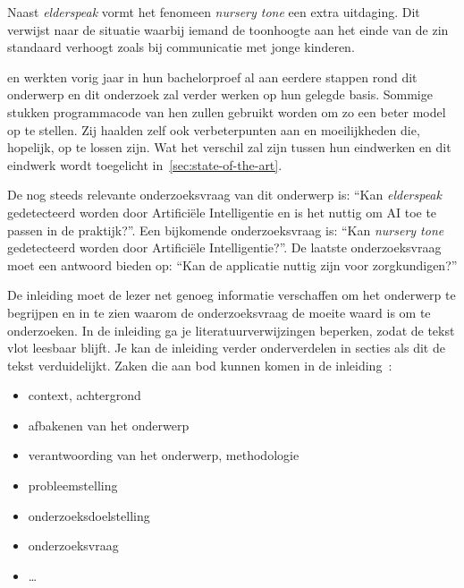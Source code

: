 Naast \textit{elderspeak} vormt het fenomeen \textit{nursery tone} een extra uitdaging. Dit verwijst naar de situatie waarbij iemand de toonhoogte aan het einde van de zin standaard verhoogt zoals bij communicatie met jonge kinderen.

\textcite{Beeckman2021} en \textcite{Standaert2021} werkten vorig jaar in hun bachelorproef al aan eerdere stappen rond dit onderwerp en dit onderzoek zal verder werken op hun gelegde basis.
Sommige stukken programmacode van hen zullen gebruikt worden om zo een beter model op te stellen.
Zij haalden zelf ook verbeterpunten aan en moeilijkheden die, hopelijk, op te lossen zijn. Wat het verschil zal zijn tussen hun eindwerken en dit eindwerk wordt toegelicht in~\ref{sec:state-of-the-art}.

De nog steeds relevante onderzoeksvraag van dit onderwerp is: ``Kan \textit{elderspeak} gedetecteerd worden door Artificiële Intelligentie en is het nuttig om AI toe te passen in de praktijk?''. Een bijkomende onderzoeksvraag is: ``Kan \textit{nursery tone} gedetecteerd worden door Artificiële Intelligentie?''. De laatste onderzoeksvraag moet een antwoord bieden op: ``Kan de applicatie nuttig zijn voor zorgkundigen?''

\color{blue}
De inleiding moet de lezer net genoeg informatie verschaffen om het onderwerp te begrijpen en in te zien waarom de onderzoeksvraag de moeite waard is om te onderzoeken. In de inleiding ga je literatuurverwijzingen beperken, zodat de tekst vlot leesbaar blijft. Je kan de inleiding verder onderverdelen in secties als dit de tekst verduidelijkt. Zaken die aan bod kunnen komen in de inleiding~\autocite{Pollefliet2011}:

\begin{itemize}
  \item context, achtergrond
  \item afbakenen van het onderwerp
  \item verantwoording van het onderwerp, methodologie
  \item probleemstelling
  \item onderzoeksdoelstelling
  \item onderzoeksvraag
  \item \ldots
\end{itemize}

\color{black}

\section{}
\label{sec:probleemstelling}

